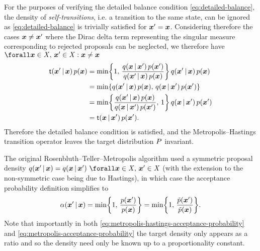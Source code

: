 For the purposes of verifying the detailed balance condition \eqref{eq:detailed-balance}, the density of \emph{self-transitions}, i.e. a transition to the same state, can be ignored as \eqref{eq:detailed-balance} is trivially satisfied for $\boldsymbol{x}' = \boldsymbol{x}$. Considering therefore the cases $\boldsymbol{x} \neq \boldsymbol{x}'$ where the Dirac delta term representing the singular measure corresponding to rejected proposals can be neglected, we therefore have $\forall \vct{x} \in \set{X},\,\vct{x}' \in \set{X} : \vct{x} \neq \vct{x}$
\begin{align}\label{eq:metropolis-hastings-detailed-balance-derivation}
  \trans(\vct{x}'\gvn\vct{x})\,\tgtdens(\vct{x}) &=
  \min\lbr 
    1,\, 
    \frac
      {q(\vct{x}\gvn\vct{x}')\,\tgtdens(\vct{x}')}
      {q(\vct{x}'\gvn\vct{x})\,\tgtdens(\vct{x})} 
  \rbr\,
  q(\vct{x}'\gvn \vct{x})\,\tgtdens(\vct{x})
  \\
  &=
  \min\lbr 
    q(\vct{x}'\gvn \vct{x})\,\tgtdens(\vct{x}),\, 
    q(\vct{x}\gvn\vct{x}')\,\tgtdens(\vct{x}')
  \rbr
  \\
  &=
  \min\lbr 
    \frac
      {q(\vct{x}'\gvn\vct{x})\,\tgtdens(\vct{x})}
      {q(\vct{x}\gvn\vct{x}')\,\tgtdens(\vct{x}')} 
    ,\, 1
  \rbr\,
  q(\vct{x}\gvn \vct{x}')\,\tgtdens(\vct{x}')
  \\
  &=
  \trans(\vct{x}\gvn\vct{x}')\,\tgtdens(\vct{x}').
\end{align}
Therefore the detailed balance condition is satisfied, and the Metropolis--Hastings transition operator leaves the target distribution $P$ invariant.

The original Rosenbluth--Teller--Metropolis algorithm used a symmetric proposal density $q(\vct{x}' \gvn \vct{x}) = q(\vct{x} \gvn \vct{x}') ~\forall \vct{x} \in \set{X},\,\vct{x}'\in\set{X}$ (with the extension to the non-symmetric case being due to Hastings), in which case the acceptance probability definition simplifies to
\begin{equation}\label{eq:metropolis-acceptance-probability}
  \alpha(\vct{x}'\gvn \vct{x}) =
  \min\lbr 1,\, \frac{\tgtdens(\vct{x}')}{\tgtdens(\vct{x})} \rbr =
  \min\lbr 1,\, \frac{\utgtdens(\vct{x}')}{\utgtdens(\vct{x})} \rbr.
\end{equation}
Note that importantly in both \eqref{eq:metropolis-hastings-acceptance-probability} and \eqref{eq:metropolis-acceptance-probability} the target density only appears as a ratio and so the density need only be known up to a proportionality constant.

